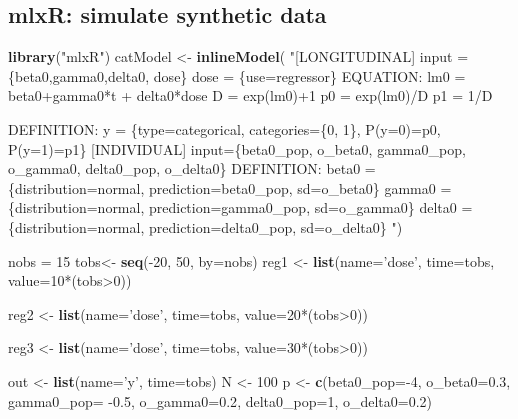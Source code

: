 \documentclass[]{book}
\newenvironment{Shaded}{\begin{snugshade}}{\end{snugshade}}
\newcommand{\KeywordTok}[1]{\textcolor[rgb]{0.13,0.29,0.53}{\textbf{{#1}}}}
\newcommand{\DataTypeTok}[1]{\textcolor[rgb]{0.13,0.29,0.53}{{#1}}}
\newcommand{\DecValTok}[1]{\textcolor[rgb]{0.00,0.00,0.81}{{#1}}}
\newcommand{\FloatTok}[1]{\textcolor[rgb]{0.00,0.00,0.81}{{#1}}}
\newcommand{\StringTok}[1]{\textcolor[rgb]{0.31,0.60,0.02}{{#1}}}
\newcommand{\NormalTok}[1]{{#1}}
\begin{document}
\subsection{mlxR: simulate synthetic
data}\label{mlxr-simulate-synthetic-data}

\begin{Shaded}
\begin{Highlighting}[]
\KeywordTok{library}\NormalTok{(}\StringTok{"mlxR"}\NormalTok{)}
\NormalTok{catModel <-}\StringTok{ }\KeywordTok{inlineModel}\NormalTok{(}
\StringTok{"[LONGITUDINAL]}
\StringTok{input =  \{beta0,gamma0,delta0, dose\}}
\StringTok{dose = \{use=regressor\}}
\StringTok{EQUATION:}
\StringTok{lm0 = beta0+gamma0*t + delta0*dose}
\StringTok{D = exp(lm0)+1}
\StringTok{p0 = exp(lm0)/D}
\StringTok{p1 = 1/D}

\StringTok{DEFINITION:}
\StringTok{y = \{type=categorical, categories=\{0, 1\}, }
\StringTok{     P(y=0)=p0,}
\StringTok{     P(y=1)=p1\}}
\StringTok{[INDIVIDUAL]}
\StringTok{input=\{beta0_pop, o_beta0,}
\StringTok{      gamma0_pop, o_gamma0,}
\StringTok{      delta0_pop, o_delta0\}}
\StringTok{DEFINITION:}
\StringTok{beta0  =\{distribution=normal, prediction=beta0_pop,  sd=o_beta0\}}
\StringTok{gamma0  =\{distribution=normal, prediction=gamma0_pop,  sd=o_gamma0\}}
\StringTok{delta0  =\{distribution=normal, prediction=delta0_pop,  sd=o_delta0\} "}\NormalTok{)}

\NormalTok{nobs =}\StringTok{ }\DecValTok{15}
\NormalTok{tobs<-}\StringTok{ }\KeywordTok{seq}\NormalTok{(-}\DecValTok{20}\NormalTok{, }\DecValTok{50}\NormalTok{, }\DataTypeTok{by=}\NormalTok{nobs)}
\NormalTok{reg1 <-}\StringTok{ }\KeywordTok{list}\NormalTok{(}\DataTypeTok{name=}\StringTok{'dose'}\NormalTok{,}
            \DataTypeTok{time=}\NormalTok{tobs,}
            \DataTypeTok{value=}\DecValTok{10}\NormalTok{*(tobs>}\DecValTok{0}\NormalTok{))}

\NormalTok{reg2 <-}\StringTok{ }\KeywordTok{list}\NormalTok{(}\DataTypeTok{name=}\StringTok{'dose'}\NormalTok{,}
            \DataTypeTok{time=}\NormalTok{tobs,}
            \DataTypeTok{value=}\DecValTok{20}\NormalTok{*(tobs>}\DecValTok{0}\NormalTok{))}

\NormalTok{reg3 <-}\StringTok{ }\KeywordTok{list}\NormalTok{(}\DataTypeTok{name=}\StringTok{'dose'}\NormalTok{,}
            \DataTypeTok{time=}\NormalTok{tobs,}
            \DataTypeTok{value=}\DecValTok{30}\NormalTok{*(tobs>}\DecValTok{0}\NormalTok{))}

\NormalTok{out  <-}\StringTok{ }\KeywordTok{list}\NormalTok{(}\DataTypeTok{name=}\StringTok{'y'}\NormalTok{, }\DataTypeTok{time=}\NormalTok{tobs)}
\NormalTok{N  <-}\StringTok{ }\DecValTok{100}
\NormalTok{p <-}\StringTok{ }\KeywordTok{c}\NormalTok{(}\DataTypeTok{beta0_pop=}\NormalTok{-}\DecValTok{4}\NormalTok{, }\DataTypeTok{o_beta0=}\FloatTok{0.3}\NormalTok{, }
       \DataTypeTok{gamma0_pop=} \NormalTok{-}\FloatTok{0.5}\NormalTok{, }\DataTypeTok{o_gamma0=}\FloatTok{0.2}\NormalTok{,}
       \DataTypeTok{delta0_pop=}\DecValTok{1}\NormalTok{, }\DataTypeTok{o_delta0=}\FloatTok{0.2}\NormalTok{)}


\end{Highlighting}
\end{Shaded}
\end{document}
